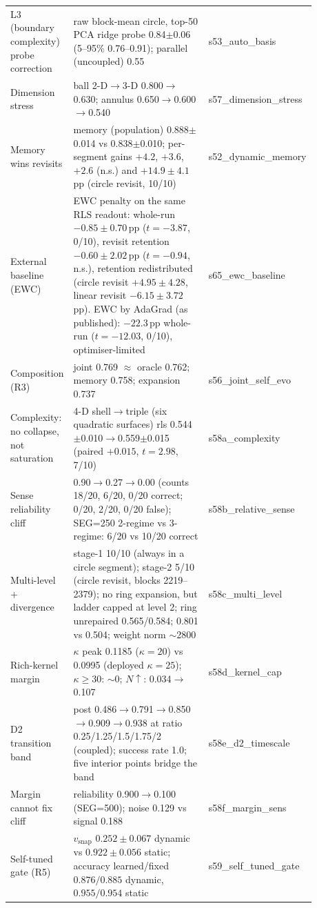 \documentclass[preprint,12pt]{elsarticle}
\begin{document}
\begin{longtable}{@{}>{\footnotesize}p{0.17\linewidth}>{\footnotesize}p{0.45\linewidth}>{\footnotesize}p{0.26\linewidth}@{}}
L3 (boundary complexity) probe correction & raw block-mean circle, top-50 PCA ridge probe 0.84$\pm$0.06 (5--95\% 0.76--0.91); parallel (uncoupled) 0.55 & s53\_auto\_basis \\
Dimension stress & ball 2-D$\to$3-D 0.800$\to$0.630; annulus 0.650$\to$0.600$\to$0.540 & s57\_dimension\_stress \\
Memory wins revisits & memory (population) 0.888$\pm$0.014 vs 0.838$\pm$0.010; per-segment gains $+4.2$, $+3.6$, $+2.6$ (n.s.) and $+14.9\pm4.1$\,pp (circle revisit, 10/10) & s52\_dynamic\_memory \\
External baseline (EWC) & EWC penalty on the same RLS readout: whole-run $-0.85\pm0.70$\,pp ($t=-3.87$, 0/10), revisit retention $-0.60\pm2.02$\,pp ($t=-0.94$, n.s.), retention redistributed (circle revisit $+4.95\pm4.28$, linear revisit $-6.15\pm3.72$\,pp). EWC by AdaGrad (as published): $-22.3$\,pp whole-run ($t=-12.03$, 0/10), optimiser-limited & s65\_ewc\_baseline \\
Composition (R3) & joint 0.769 $\approx$ oracle 0.762; memory 0.758; expansion 0.737 & s56\_joint\_self\_evo \\
Complexity: no collapse, not saturation & 4-D shell$\to$triple (six quadratic surfaces) rls 0.544$\pm$0.010$\to$0.559$\pm$0.015 (paired $+0.015$, $t=2.98$, 7/10) & s58a\_complexity \\
Sense reliability cliff & 0.90$\to$0.27$\to$0.00 (counts 18/20, 6/20, 0/20 correct; 0/20, 2/20, 0/20 false); SEG=250 2-regime vs 3-regime: 6/20 vs 10/20 correct & s58b\_relative\_sense \\
Multi-level + divergence & stage-1 10/10 (always in a circle segment); stage-2 5/10 (circle revisit, blocks 2219--2379); no ring expansion, but ladder capped at level 2; ring unrepaired 0.565/0.584; 0.801 vs 0.504; weight norm $\sim$2800 & s58c\_multi\_level \\
Rich-kernel margin & $\kappa$ peak 0.1185 ($\kappa{=}20$) vs 0.0995 (deployed $\kappa{=}25$); $\kappa{\ge}30$: $\sim$0; $N\uparrow$: 0.034$\to$0.107 & s58d\_kernel\_cap \\
D2 transition band & post 0.486$\to$0.791$\to$0.850$\to$0.909$\to$0.938 at ratio 0.25/1.25/1.5/1.75/2 (coupled); success rate 1.0; five interior points bridge the band & s58e\_d2\_timescale \\
Margin cannot fix cliff & reliability 0.900$\to$0.100 (SEG=500); noise 0.129 vs signal 0.188 & s58f\_margin\_sens \\
Self-tuned gate (R5) & $v_{\mathrm{snap}}$ $0.252\pm0.067$ dynamic vs $0.922\pm0.056$ static; accuracy learned/fixed $0.876/0.885$ dynamic, $0.955/0.954$ static & s59\_self\_tuned\_gate \\

\end{longtable}
\end{document}
